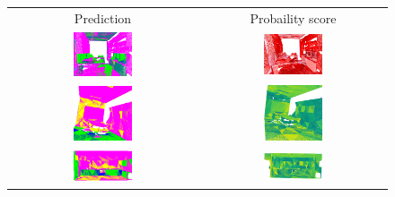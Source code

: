     \begin{figure}[h!]
        \centering
        \begin{tabular}{cc}
            Prediction & Probaility score \\
            \includegraphics[width=0.33\textwidth, height=0.18\textheight]{images/seg_output/s3dis_DE/S3DIS_1_Pred.png}& 
            \includegraphics[width=0.33\textwidth, height=0.18\textheight]{images/seg_output/s3dis_DE/S3DIS_1_prob.png}\\

            \includegraphics[width=0.33\textwidth, height=0.18\textheight]{images/seg_output/s3dis_DE/S3DIS_2_Pred.png}& 
            \includegraphics[width=0.33\textwidth, height=0.18\textheight]{images/seg_output/s3dis_DE/S3DIS_2_prob.png}\\

            \includegraphics[width=0.33\textwidth, height=0.18\textheight]{images/seg_output/s3dis_DE/S3DIS_3_Pred.png}& 
            \includegraphics[width=0.33\textwidth, height=0.18\textheight]{images/seg_output/s3dis_DE/S3DIS_3_prob.png}\\


\end{tabular}
\end{figure}
